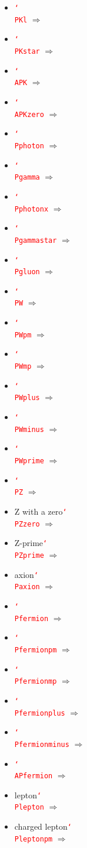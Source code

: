 \documentclass[12pt]{article}
\newcommand{\texcmd}[1]{\textcolor{red}{\texttt{\char`\\#1}}}
\begin{document}
\begin{multicols}{2}
{\begin{itemize}
\item  \texcmd{PKl} $\Rightarrow$ \PKl
\item  \texcmd{PKstar} $\Rightarrow$ \PKstar
\item  \texcmd{APK} $\Rightarrow$ \APK
\item  \texcmd{APKzero} $\Rightarrow$ \APKzero
\item  \texcmd{Pphoton} $\Rightarrow$ \Pphoton
\item  \texcmd{Pgamma} $\Rightarrow$ \Pgamma
\item  \texcmd{Pphotonx} $\Rightarrow$ \Pphotonx
\item  \texcmd{Pgammastar} $\Rightarrow$ \Pgammastar
\item  \texcmd{Pgluon} $\Rightarrow$ \Pgluon
\item  \texcmd{PW} $\Rightarrow$ \PW
\item  \texcmd{PWpm} $\Rightarrow$ \PWpm
\item  \texcmd{PWmp} $\Rightarrow$ \PWmp
\item  \texcmd{PWplus} $\Rightarrow$ \PWplus
\item  \texcmd{PWminus} $\Rightarrow$ \PWminus
\item  \texcmd{PWprime} $\Rightarrow$ \PWprime
\item  \texcmd{PZ} $\Rightarrow$ \PZ
\item Z with a zero\newline \texcmd{PZzero} $\Rightarrow$ \PZzero
\item Z-prime\newline \texcmd{PZprime} $\Rightarrow$ \PZprime
\item axion\newline \texcmd{Paxion} $\Rightarrow$ \Paxion
\item  \texcmd{Pfermion} $\Rightarrow$ \Pfermion
\item  \texcmd{Pfermionpm} $\Rightarrow$ \Pfermionpm
\item  \texcmd{Pfermionmp} $\Rightarrow$ \Pfermionmp
\item  \texcmd{Pfermionplus} $\Rightarrow$ \Pfermionplus
\item  \texcmd{Pfermionminus} $\Rightarrow$ \Pfermionminus
\item  \texcmd{APfermion} $\Rightarrow$ \APfermion
\item lepton\newline \texcmd{Plepton} $\Rightarrow$ \Plepton
\item charged lepton\newline \texcmd{Pleptonpm} $\Rightarrow$ \Pleptonpm

\end{itemize}}
\end{multicols}
\end{document}
